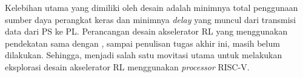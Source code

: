 Kelebihan utama yang dimiliki oleh desain \parencite{yang2023design} adalah minimnya total penggunaan sumber daya perangkat keras dan minimnya \textit{delay} yang muncul dari transmisi data dari PS ke PL. Perancangan desain akselerator \ac{RL} yang menggunakan pendekatan sama dengan \parencite{yang2023design}, sampai penulisan tugas akhir ini, masih belum dilakukan. Sehingga, menjadi salah satu movitasi utama untuk melakukan eksplorasi desain akselerator \ac{RL} menggunakan \textit{processor} RISC-V.

